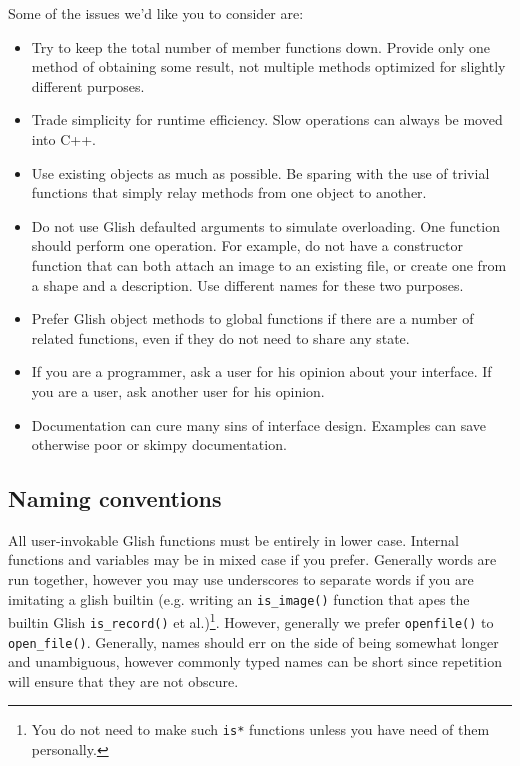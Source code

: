 Some of the issues we'd like you to consider are:
\begin{itemize}
    \item Try to keep the total number of member functions down.  Provide
    only one method of obtaining some result, not multiple methods
    optimized for slightly different purposes.

    \item Trade simplicity for runtime efficiency. Slow operations can
    always be moved into C++.

    \item Use existing objects as much as possible. Be sparing with the use of
    trivial functions that simply relay methods from one object 
    to another.

    \item Do not use Glish defaulted arguments to simulate overloading.
    One function should perform one operation. For example, do not have a
    constructor function that can both attach an image to an existing
    file, or create one from a shape and a description. Use different
    names for these two purposes.

    \item Prefer Glish object methods to global functions if
    there are a number of related functions, even if they do not need to
    share any state.

    \item If you are a programmer, ask a user for his opinion about your
    interface. If you are a user, ask another user for his opinion.

    \item Documentation can cure many sins of interface design. Examples
    can save otherwise poor or skimpy documentation.
\end{itemize}

\subsection{Naming conventions}

All user-invokable Glish functions must be entirely in lower
case. Internal functions and variables may be in mixed case if you
prefer. Generally words are run together, however you may use
underscores to separate words if you are imitating a glish builtin
(e.g. writing an {\tt is\_image()} function that apes the builtin
Glish {\tt is\_record()} et al.)\footnote{You do not need to make such
{\tt is*} functions unless you have need of them
personally.}. However, generally we prefer {\tt openfile()} to {\tt
open\_file()}. Generally, names should err on the side of being
somewhat longer and unambiguous, however commonly typed names can be
short since repetition will ensure that they are not obscure.

